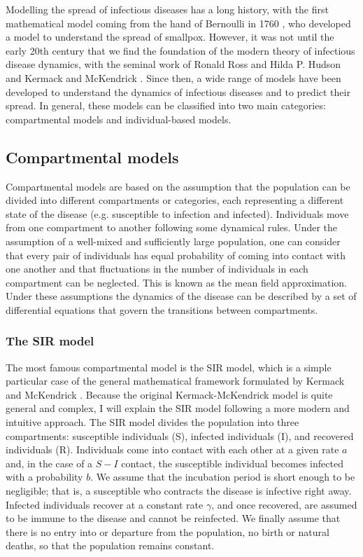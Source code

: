 Modelling the spread of infectious diseases has a long history, with the first
mathematical model coming from the hand of Bernoulli in 1760
\cite{Bernoulli1760}, who developed a model to understand the spread of
smallpox. However, it was not until the early 20th century that we find the
foundation of the modern theory of infectious disease dynamics, with the
seminal work of Ronald Ross and Hilda P. Hudson
\cite{Ross1916,Ross1917,Ross1917_2} and Kermack and McKendrick
\cite{McKendrick}. Since then, a wide range of models have been
developed to understand the dynamics of infectious diseases and to predict
their spread. In general, these models can be classified into two main
categories: compartmental models and individual-based models.

\subsection{\label{sec:Compartmental models} Compartmental models}

Compartmental models are based on the assumption that the population can be
divided into different compartments or categories, each representing a
different state of the disease (e.g. susceptible to infection and infected).
Individuals move from one compartment to another following some dynamical
rules. Under the assumption of a well-mixed and sufficiently large population,
one can consider that  every pair of individuals has equal probability of
coming into contact with one another and that fluctuations in the number of
individuals in each compartment can be neglected. This is known as the mean
field approximation. Under these assumptions the dynamics of the disease can be
described by a set of differential equations that govern the transitions
between compartments.

\subsubsection*{\label{sec:The SIR model} The SIR model}

The most famous compartmental model is the SIR model, which is a simple
particular case of the general mathematical framework formulated by Kermack and
McKendrick \cite{McKendrick}. Because the original Kermack-McKendrick model
is quite general and complex, I will explain the SIR model following a more
modern and intuitive approach. The SIR model divides the population into three
compartments: susceptible individuals (S), infected individuals (I), and
recovered individuals (R). Individuals come into contact with each other at a
given rate $a$ and, in the case of a $S-I$ contact, the susceptible individual
becomes infected with a probability $b$. We assume that the incubation period
is short enough to be negligible; that is, a susceptible who contracts the
disease is infective right away. Infected individuals recover at a constant
rate $\gamma$, and once recovered, are assumed to be immune to the disease and
cannot be reinfected. We finally assume that there is no entry into or
departure from the population, no birth or natural deaths, so that
the population remains constant.

